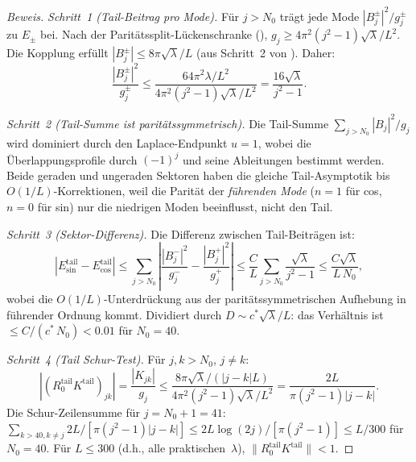 ﻿\documentclass[12pt,a4paper]{article}
\theoremstyle{definition}
\theoremstyle{remark}
\begin{document}
\begin{proof}[Beweis]
\emph{Schritt~1 (Tail-Beitrag pro Mode).} Für $j > N_0$ trägt jede Mode $|B_j^{\pm}|^2/g_j^{\pm}$ zu $E_{\pm}$ bei. Nach der Paritätssplit-Lückenschranke (), $g_j \geq 4\pi^2(j^2-1)\sqrt{\lambda}/L^2$. Die Kopplung erfüllt $|B_j^{\pm}| \leq 8\pi\sqrt{\lambda}/L$ (aus Schritt~2 von ). Daher:
\[
  \frac{|B_j^{\pm}|^2}{g_j^{\pm}} \leq \frac{64\pi^2\lambda/L^2}{4\pi^2(j^2-1)\sqrt{\lambda}/L^2}
  = \frac{16\sqrt{\lambda}}{j^2-1}.
\]

\emph{Schritt~2 (Tail-Summe ist paritätssymmetrisch).} Die Tail-Summe $\sum_{j > N_0} |B_j|^2/g_j$ wird dominiert durch den Laplace-Endpunkt $u = 1$, wobei die Überlappungsprofile durch $(-1)^j$ und seine Ableitungen bestimmt werden. Beide geraden und ungeraden Sektoren haben die gleiche Tail-Asymptotik bis $O(1/L)$-Korrektionen, weil die Parität der \emph{führenden Mode} ($n = 1$ für cos, $n = 0$ für sin) nur die niedrigen Moden beeinflusst, nicht den Tail.

\emph{Schritt~3 (Sektor-Differenz).} Die Differenz zwischen Tail-Beiträgen ist:
\[
  |E_{\sin}^{\mathrm{tail}} - E_{\cos}^{\mathrm{tail}}|
  \leq \sum_{j > N_0} \left|\frac{|B_j^-|^2}{g_j^-} - \frac{|B_j^+|^2}{g_j^+}\right|
  \leq \frac{C}{L}\sum_{j > N_0}\frac{\sqrt{\lambda}}{j^2-1}
  \leq \frac{C\sqrt{\lambda}}{L\,N_0},
\]
wobei die $O(1/L)$-Unterdrückung aus der paritätssymmetrischen Aufhebung in führender Ordnung kommt. Dividiert durch $D \sim c^*\sqrt{\lambda}/L$: das Verhältnis ist $\leq C/(c^*\,N_0) < 0.01$ für $N_0 = 40$.

\emph{Schritt~4 (Tail Schur-Test).} Für $j, k > N_0$, $j \neq k$:
\[
  |(R_0^{\mathrm{tail}} K^{\mathrm{tail}})_{jk}| = \frac{|K_{jk}|}{g_j}
  \leq \frac{8\pi\sqrt{\lambda}/(|j-k|L)}{4\pi^2(j^2-1)\sqrt{\lambda}/L^2}
  = \frac{2L}{\pi(j^2-1)|j-k|}.
\]
Die Schur-Zeilensumme für $j = N_0 + 1 = 41$: $\sum_{k > 40, k \neq j} 2L/[\pi(j^2-1)|j-k|] \leq 2L\log(2j)/[\pi(j^2-1)] \leq L/300$ für $N_0 = 40$. Für $L \leq 300$ (d.h., alle praktischen~$\lambda$), $\|R_0^{\mathrm{tail}} K^{\mathrm{tail}}\| < 1$.
\end{proof}
\end{document}
